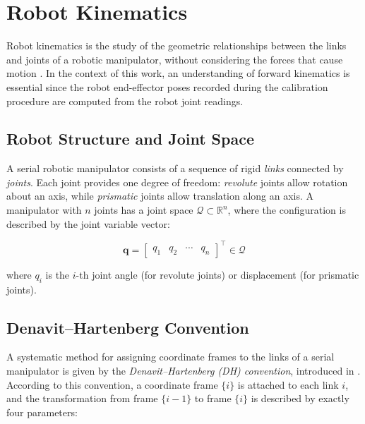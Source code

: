 \section{Robot Kinematics}
\label{sec:robot_kinematics}

Robot kinematics is the study of the geometric relationships between the links
and joints of a robotic manipulator, without considering the forces that cause
motion \cite{siciliano2009robotics, craig2005introduction}. In the context of
this work, an understanding of forward kinematics is essential since the robot
end-effector poses recorded during the calibration procedure are computed from
the robot joint readings.

\subsection{Robot Structure and Joint Space}
\label{subsec:robot_structure}

A serial robotic manipulator consists of a sequence of rigid \textit{links}
connected by \textit{joints}. Each joint provides one degree of freedom:
\textit{revolute} joints allow rotation about an axis, while
\textit{prismatic} joints allow translation along an axis. A manipulator with
$n$ joints has a joint space $\mathcal{Q} \subset \mathbb{R}^n$, where the
configuration is described by the joint variable vector:

\begin{equation}
    \mathbf{q} = \begin{bmatrix} q_1 & q_2 & \cdots & q_n \end{bmatrix}^{\top}
    \in \mathcal{Q}
    \label{eq:joint_vector}
\end{equation}

\noindent where $q_i$ is the $i$-th joint angle (for revolute joints) or
displacement (for prismatic joints).


\subsection{Denavit--Hartenberg Convention}
\label{subsec:dh}

A systematic method for assigning coordinate frames to the links of a serial
manipulator is given by the \textit{Denavit--Hartenberg (DH) convention},
introduced in \cite{denavit1955kinematic}. According to this convention, a
coordinate frame $\{i\}$ is attached to each link $i$, and the transformation
from frame $\{i-1\}$ to frame $\{i\}$ is described by exactly four parameters:

